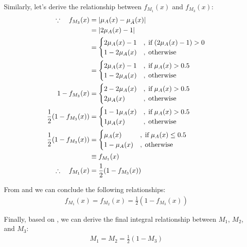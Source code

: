 \documentclass{tron}
\begin{document}
Similarly, let's derive the relationship between $f_{M_1}(x)$ and $f_{M_3}(x)$:
\begin{align}
	\because \quad f_{M_3}(x) 	& = |\mu_A(x) - \mu_{\bar A}(x)| \\
				& = |2\mu_A(x) - 1| \\
				& = \begin{cases}
					2\mu_A(x) - 1 &,\;\text{if}\; (2\mu_A(x) - 1) > 0 \\
					1 - 2\mu_A(x) &,\;\text{otherwise}
				\end{cases} \\
				& = \begin{cases}
					2\mu_A(x) - 1 &,\;\text{if}\; \mu_A(x) > 0.5 \\
					1 - 2\mu_A(x) &,\;\text{otherwise}
				\end{cases} \\
	1 - f_{M_3}(x) & = \begin{cases}
					2 - 2\mu_A(x) &,\;\text{if}\; \mu_A(x) > 0.5 \\
					2\mu_A(x) &,\;\text{otherwise}
				\end{cases} \\
	\frac12(1 - f_{M_3}(x)) & = \begin{cases}
					1 - 1\mu_A(x) &,\;\text{if}\; \mu_A(x) > 0.5 \\
					1\mu_A(x) &,\;\text{otherwise}
				\end{cases} \\
	\frac12(1 - f_{M_3}(x)) &= \begin{cases}
					\mu_A(x) & ,\;\text{if}\; \mu_A(x) \leq 0.5 \\
					1-\mu_A(x) & ,\;\text{otherwise}
				\end{cases} \\
				& \equiv f_{M_1}(x) \\
	\therefore \quad f_{M_1}(x) &= \frac12(1 - f_{M_3}(x)) \label{eqn:p1:m3=m1}
\end{align} 

From  and  we can conclude the following relationships:
\begin{align}
	f_{M_1}(x) = f_{M_2}(x) = \frac12 (1 - f_{M_3}(x))
\end{align}

Finally, based on , we can derive the final integral relationship between $M_1$, $M_2$, and $M_3$:
\begin{align}
	M_1 = M_2 = \frac12 (1 - M_3)
\end{align}
\end{document}
